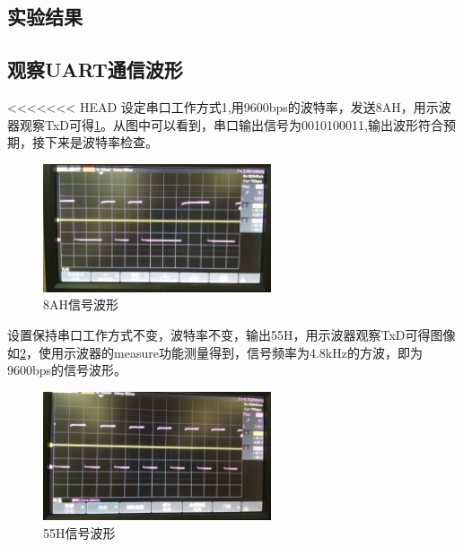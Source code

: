 \documentclass{article}
\begin{document}
\begin{CJK}{UTF8}{gkai}
\section{实验结果}
\subsection{观察UART通信波形}
<<<<<<< HEAD
设定串口工作方式1,用9600bps的波特率，发送8AH，用示波器观察TxD可得\ref{pro1_1}。从图中可以看到，串口输出信号为0010100011,输出波形符合预期，接下来是波特率检查。
\begin{figure}
  \centering
  \includegraphics[width=0.6\textwidth]{code.jpg}
  \caption{8AH信号波形}
  \label{pro1_1}
\end{figure}
设置保持串口工作方式不变，波特率不变，输出55H，用示波器观察TxD可得图像如\ref{pro1_2}，使用示波器的measure功能测量得到，信号频率为4.8kHz的方波，即为9600bps的信号波形。
\begin{figure}
  \centering
  \includegraphics[width=0.6\textwidth]{frequency.jpg}
  \caption{55H信号波形}
  \label{pro1_2}
\end{figure}

\end{CJK}
\end{document}
